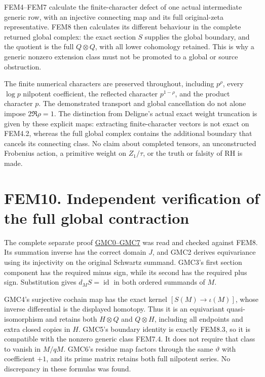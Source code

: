 FEM4--FEM7 calculate the finite-character defect of one actual
intermediate generic row, with an injective connecting map and its full
original-zeta representative. FEM8 then calculates its different
behaviour in the complete returned global complex: the exact section
\(S\) supplies the global boundary, and the quotient is the full
\(Q\otimes Q\), with all lower cohomology retained. This is why a
generic nonzero extension class must not be promoted to a global or
source obstruction.

The finite numerical characters are preserved throughout, including
\(p^\rho\), every \(\log p\) nilpotent coefficient, the reflected
character \(p^{1-\rho}\), and the product character \(p\). The
demonstrated transport and global cancellation do not alone impose
\(2\Re\rho=1\). The distinction from Deligne's actual exact weight
truncation is given by these explicit maps: extracting finite-character
vectors is not exact on FEM4.2, whereas the full global complex contains
the additional boundary that cancels its connecting class. No claim
about completed tensors, an unconstructed Frobenius action, a primitive
weight on \(Z_1/\tau\), or the truth or falsity of RH is made.

\section{FEM10. Independent verification of the full global
contraction}\label{fem10.-independent-verification-of-the-full-global-contraction}

The complete separate proof
\href{https://github.com/KokunoYumeto/zeta-function-research-reader/blob/main/workbenches/splitzero-tandem/continuations/20260925-full-source-tensor-and-original-divisor/counterfactual/GLOBAL_MIXED_RETURN_CONTRACTION.md}{GMC0--GMC7}
was read and checked against FEM8. Its summation inverse has the correct
domain \(J\), and GMC2 derives equivariance using its injectivity on the
original Schwartz summand. GMC3's first section component has the
required minus sign, while its second has the required plus sign.
Substitution gives \(d_MS=\operatorname{id}\) in both ordered summands
of \(M\).

GMC4's surjective cochain map has the exact kernel
\([S(M)\to\iota(M)]\), whose inverse differential is the displayed
homotopy. Thus it is an equivariant quasi-isomorphism and retains both
\(H\otimes Q\) and \(Q\otimes H\), including all endpoints and extra
closed copies in \(H\). GMC5's boundary identity is exactly FEM8.3, so
it is compatible with the nonzero generic class FEM7.4. It does not
require that class to vanish in \(M/qM\). GMC6's residue map factors
through the same \(\vartheta\) with coefficient \(+1\), and its prime
matrix retains both full nilpotent series. No discrepancy in these
formulas was found.

